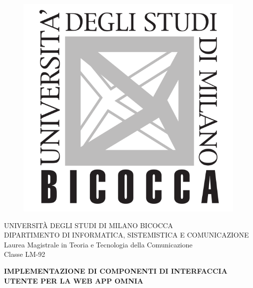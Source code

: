 
\begin{titlepage}
\begin{figure}[H]
    \centering
    \includegraphics[keepaspectratio=true,scale=0.2]{images/frontespizio/logo.png}
\end{figure}

\begin{center}
  {\LARGE{UNIVERSITÀ DEGLI STUDI DI MILANO BICOCCA}}
  \vspace{5mm}
  \\ {\large{DIPARTIMENTO DI INFORMATICA, SISTEMISTICA E COMUNICAZIONE}}
  \vspace{5mm}
  \\ {\Large{Laurea Magistrale in Teoria e Tecnologia della Comunicazione}}
  \vspace{2mm}
  \\ {\large{Classe LM-92}}
\end{center}

\vspace{10mm}
\begin{center}
  {\Large{\bf{IMPLEMENTAZIONE DI COMPONENTI DI INTERFACCIA UTENTE PER LA WEB APP OMNIA}}}
\end{center}
\vspace{25mm}


\end{titlepage}
